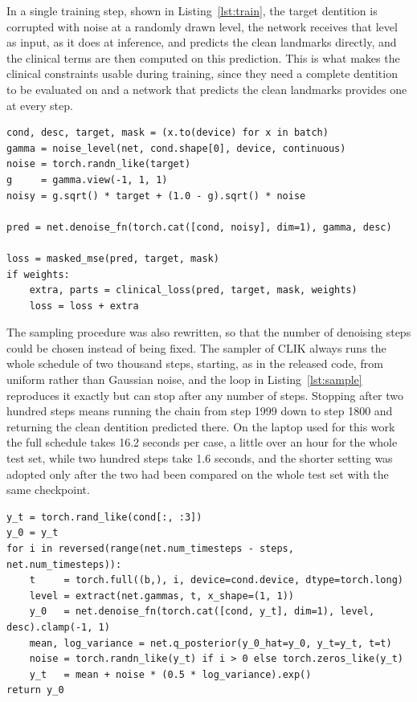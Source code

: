\documentclass[10pt,a4paper]{article}
\begin{document}
In a single training step, shown in Listing~\ref{lst:train}, the target dentition is corrupted with noise at a randomly drawn level, the network receives that level as input, as it does at inference, and predicts the clean landmarks directly, and the clinical terms are then computed on this prediction. This is what makes the clinical constraints usable during training, since they need a complete dentition to be evaluated on and a network that predicts the clean landmarks provides one at every step.

\begin{lstlisting}[float=htbp,caption={One training step of the generative pipeline, where \texttt{gamma} is the noise level of the sampled step, given by the cumulative product of the $\alpha_t$ up to it, \texttt{cond} the detected landmarks with their identifiers and \texttt{desc} the shape descriptor.},label={lst:train}]
cond, desc, target, mask = (x.to(device) for x in batch)
gamma = noise_level(net, cond.shape[0], device, continuous)
noise = torch.randn_like(target)
g     = gamma.view(-1, 1, 1)
noisy = g.sqrt() * target + (1.0 - g).sqrt() * noise

pred = net.denoise_fn(torch.cat([cond, noisy], dim=1), gamma, desc)

loss = masked_mse(pred, target, mask)
if weights:
    extra, parts = clinical_loss(pred, target, mask, weights)
    loss = loss + extra
\end{lstlisting}

The sampling procedure was also rewritten, so that the number of denoising steps could be chosen instead of being fixed. The sampler of CLIK always runs the whole schedule of two thousand steps, starting, as in the released code, from uniform rather than Gaussian noise, and the loop in Listing~\ref{lst:sample} reproduces it exactly but can stop after any number of steps. Stopping after two hundred steps means running the chain from step 1999 down to step 1800 and returning the clean dentition predicted there. On the laptop used for this work the full schedule takes 16.2 seconds per case, a little over an hour for the whole test set, while two hundred steps take 1.6 seconds, and the shorter setting was adopted only after the two had been compared on the whole test set with the same checkpoint.

\begin{lstlisting}[float=htbp,caption={The sampling loop modified to accept an arbitrary step count. \texttt{y\_0} denotes the predicted clean landmark set and \texttt{y\_t} the noisy iterate; setting \texttt{steps = 2000} reproduces the original sampling chain.},label={lst:sample}]
y_t = torch.rand_like(cond[:, :3])
y_0 = y_t
for i in reversed(range(net.num_timesteps - steps, net.num_timesteps)):
    t     = torch.full((b,), i, device=cond.device, dtype=torch.long)
    level = extract(net.gammas, t, x_shape=(1, 1))
    y_0   = net.denoise_fn(torch.cat([cond, y_t], dim=1), level, desc).clamp(-1, 1)
    mean, log_variance = net.q_posterior(y_0_hat=y_0, y_t=y_t, t=t)
    noise = torch.randn_like(y_t) if i > 0 else torch.zeros_like(y_t)
    y_t   = mean + noise * (0.5 * log_variance).exp()
return y_0
\end{lstlisting}
\end{document}

